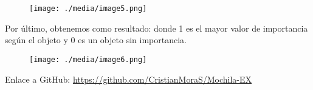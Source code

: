 \documentclass[12pt]{article}
\renewcommand{\_}{\kern-1.5pt\textunderscore\kern-1.5pt}
\begin{document}
\begin{figure}[H]
	\begin{Center}
		\texttt{[image: ./media/image5.png]}
	\end{Center}
\end{figure}



\par

Por último, obtenemos como resultado: donde 1 es el mayor valor de importancia según el objeto y 0 es un objeto sin importancia.\par




\begin{figure}[H]
	\begin{Center}
		\texttt{[image: ./media/image6.png]}
	\end{Center}
\end{figure}



\par

Enlace a GitHub: \href{https://github.com/CristianMoraS/Mochila-EX}{https://github.com/CristianMoraS/Mochila-EX}\par


\vspace{\baselineskip}

\vspace{\baselineskip}

\vspace{\baselineskip}

\vspace{\baselineskip}

\printbibliography
\end{document}
